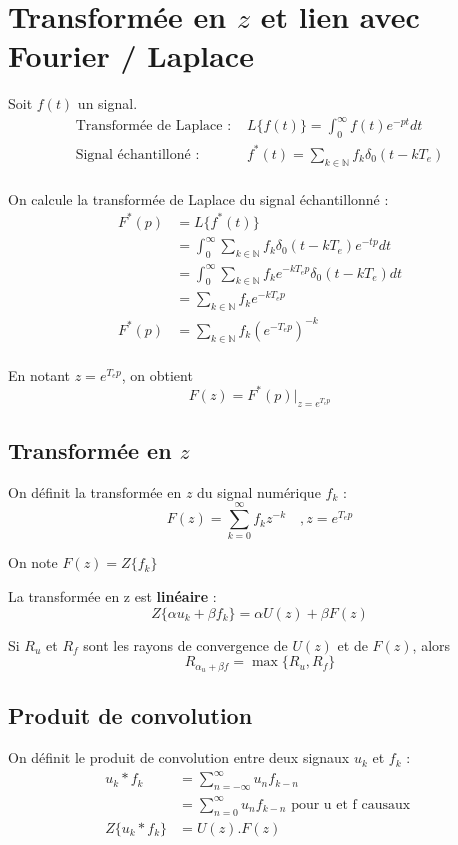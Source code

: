 \documentclass[main.tex]{subfiles}
\begin{document}
\section{Transformée en $z$ et lien avec Fourier / Laplace}

Soit $f(t)$ un signal.
\begin{align*}
\text{Transformée de Laplace : } & L\{f(t)\} = \int_0^{\infty}f(t)e^{-pt}dt \\
\text{Signal échantilloné : } & f^*(t) = \sum_{k\in\mathbb{N}}f_k\delta_ 0(t-kT_e) \\
\end{align*}

On calcule la transformée de Laplace du signal échantillonné :
\begin{align*}
F^*(p) & = L\{f^*(t)\} \\
& = \int_ 0^{\infty}\sum_{k\in\mathbb{N}}f_k\delta_ 0(t-kT_e)e^{-tp}dt \\
& = \int_ 0^{\infty}\sum_{k\in\mathbb{N}}f_ke^{-kT_ep}\delta_ 0(t-kT_e)dt \\
& = \sum_{k\in\mathbb{N}}f_ke^{-kT_ep} \\
F^*(p) & = \sum_{k\in\mathbb{N}}f_k(e^{-T_ep})^{-k} \\
\end{align*}

En notant $z = e^{T_ep}$, on obtient
\[ \boxed{ F(z) = F^*(p)|_{z=e^{T_ep}} } \]

\subsection*{Transformée en $z$}
\begin{defin}
On définit la transformée en $z$ du signal numérique $f_k$ :
\[ F(z) = \sum_{k = 0}^{\infty} f_kz^{-k} \quad, z = e^{T_ep}\]

On note $F(z) = Z\{f_k\}$
\end{defin}

\begin{prop}
La transformée en z est \textbf{linéaire} : \[ Z\{\alpha u_k + \beta f_k\} = \alpha U(z) + \beta F(z) \]

Si $R_u$ et $R_f$ sont les rayons de convergence de $U(z)$ et de $F(z)$, alors \[R_{\alpha_u + \beta f} = \max \{ R_u,R_f \} \]
\end{prop}

\subsection*{Produit de convolution}
\begin{defin}
On définit le produit de convolution entre deux signaux $u_k$ et $f_k$ :
\begin{align*}
u_k * f_k & = \sum_{n=-\infty}^{\infty} u_n f_{k-n} \\
& = \sum_{n=0}^{\infty} u_n f_{k-n} \text{ pour u et f causaux } \\
Z\{u_k * f_k\} & = U(z).F(z)
\end{align*}
\end{defin}
\end{document}
